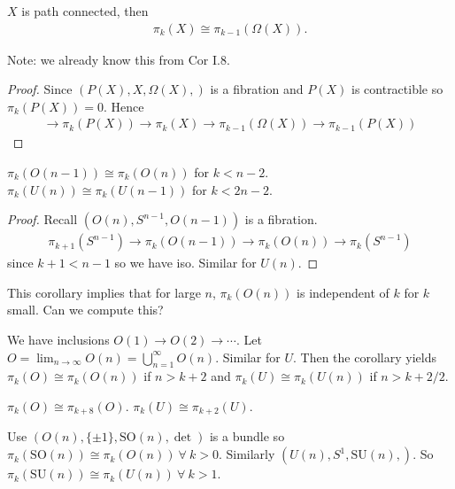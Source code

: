 \documentclass[12pt,class=article,crop=false]{standalone}
\begin{document}
\begin{coro}
$ X$ is path connected, then
 \begin{align*}
	\pi_k(X) \cong \pi_{k-1}( \Omega(X)).
\end{align*}
\end{coro}
Note: we already know this from Cor I.8.
\begin{proof}
Since $ (P(X),X, \Omega(X),)$ is a fibration and $ P(X)$ is contractible so  $ \pi_k(P(X)) =0$. Hence
\begin{align*}
	\to \pi_k(P(X)) \to \pi_k(X) \to \pi_{k-1}(\Omega(X)) \to \pi_{k-1} (P(X))
\end{align*}
\end{proof}
\begin{coro}
$ \pi_k(O(n-1)) \cong \pi_k(O(n))$ for $ k<n-2$.
 $ \pi_k(U(n)) \cong \pi_k(U(n-1))$ for $ k<2n-2$.
\end{coro}
\begin{proof}
Recall $ (O(n),S^{n-1},O(n-1))$ is a fibration.
\begin{align*}
	\pi_{k+1} (S^{n-1}) \to \pi_{k} (O(n-1)) \to \pi_{k} (O(n)) \to \pi_{k} (S^{n-1})
\end{align*}
since $ k+1 <n-1$ so we have iso. Similar for  $ U(n)$.
\end{proof}
\begin{remark}
This corollary implies that for large $ n$,  $ \pi_k(O(n))$ is independent of $ k$ for  $ k$ small. Can we compute this?

We have inclusions  $ O(1) \to O(2) \to \cdots$. Let $ O = \lim_{ n \to \infty} O(n) = \bigcup_{ n =1}^{\infty} O(n)$. Similar for $ U$. Then the corollary yields  $ \pi_k(O) \cong \pi_k(O(n))$ if $ n > k+2$ and  $ \pi_k(U) \cong \pi_k(U(n))$ if $ n> k+2 /2$.
\end{remark}

\begin{thm}
$ \pi_k(O) \cong \pi_{k+8}(O)$.
$ \pi_k(U) \cong \pi_{k+2}(U)$.
\end{thm}

\begin{remark}
Use $ (O(n),\{\pm 1\}, \text{SO}( n) , \det)$ is a bundle so $ \pi_k( \text{SO}( n) ) \cong \pi_k(O(n)) \ \forall \ k >0$. Similarly $ (U(n),S^{1}, \text{SU}( n) ,)$. So $ \pi_k( \text{SU}( n) ) \cong \pi_k(U(n)) \ \forall \ k>1$.
\end{remark}
\end{document}

